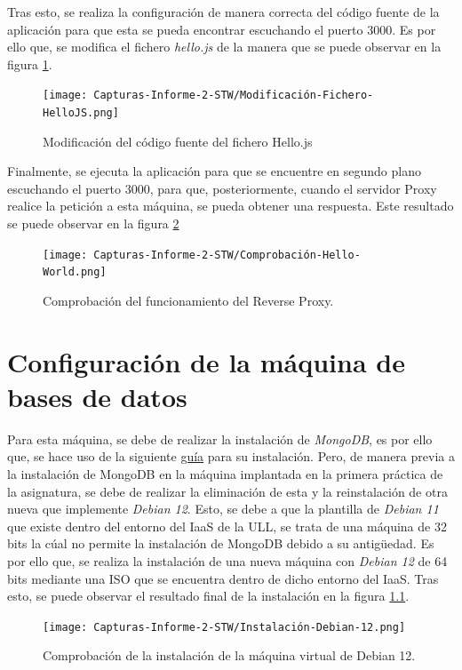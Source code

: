 \documentclass{report}
\begin{document}
  Tras esto, se realiza la configuración de manera correcta del código fuente de la aplicación para que esta se pueda encontrar escuchando el puerto 3000. Es por ello que, se modifica el fichero \emph{hello.js} de la manera que se puede observar en la figura \ref{fig:Configuración-puerto-3000}.

  \begin{figure}[H]
    \centering
    \texttt{[image: Capturas-Informe-2-STW/Modificación-Fichero-HelloJS.png]}
    \caption{Modificación del código fuente del fichero Hello.js}
    \label{fig:Configuración-puerto-3000}
  \end{figure}

  Finalmente, se ejecuta la aplicación para que se encuentre en segundo plano escuchando el puerto 3000, para que, posteriormente, cuando el servidor Proxy realice la petición a esta máquina, se pueda obtener una respuesta. Este resultado se puede observar en la figura \ref{fig:Comprobación-Backend}

  \begin{figure}[H]
    \centering
    \texttt{[image: Capturas-Informe-2-STW/Comprobación-Hello-World.png]}
    \caption{Comprobación del funcionamiento del Reverse Proxy.}
    \label{fig:Comprobación-Backend}
  \end{figure}

  \chapter{Configuración de la máquina de bases de datos}
  Para esta máquina, se debe de realizar la instalación de \emph{MongoDB}, es por ello que, se hace uso de la siguiente \href{https://www.mongodb.com/docs/manual/tutorial/install-mongodb-on-debian/}{guía} para su instalación. Pero, de manera previa a la instalación de MongoDB en la máquina implantada en la primera práctica de la asignatura, se debe de realizar la eliminación de esta y la reinstalación de otra nueva que implemente \emph{Debian 12}. Esto, se debe a que la plantilla de \emph{Debian 11} que existe dentro del entorno del IaaS de la ULL, se trata de una máquina de 32 bits la cúal no permite la instalación de MongoDB debido a su antigüedad. Es por ello que, se realiza la instalación de una nueva máquina con \emph{Debian 12} de 64 bits mediante una ISO que se encuentra dentro de dicho entorno del IaaS. Tras esto, se puede observar el resultado final de la instalación en la figura \ref{fig:Comprobación-Debian12}.

  \begin{figure}[H]
    \centering
    \texttt{[image: Capturas-Informe-2-STW/Instalación-Debian-12.png]}
    \caption{Comprobación de la instalación de la máquina virtual de Debian 12.}
    \label{fig:Comprobación-Debian12}
  \end{figure}
\end{document}
